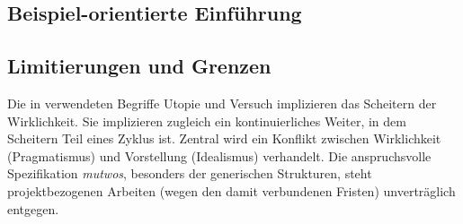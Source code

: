 \documentclass[12pt,a4paper,ngerman]{article}
\begin{document}

\subsection{Beispiel-orientierte Einführung}

%
%



\subsection{Limitierungen und Grenzen}

Die in \emph{} verwendeten Begriffe Utopie und Versuch implizieren das Scheitern der Wirklichkeit.
Sie implizieren zugleich ein kontinuierliches Weiter, in dem Scheitern Teil eines Zyklus ist.
Zentral wird ein Konflikt zwischen Wirklichkeit (Pragmatismus) und Vorstellung (Idealismus) verhandelt.
Die anspruchsvolle Spezifikation \emph{mutwos}, besonders der generischen Strukturen, steht projektbezogenen Arbeiten (wegen den damit verbundenen Fristen) unverträglich entgegen.

\smallskip
\end{document}
